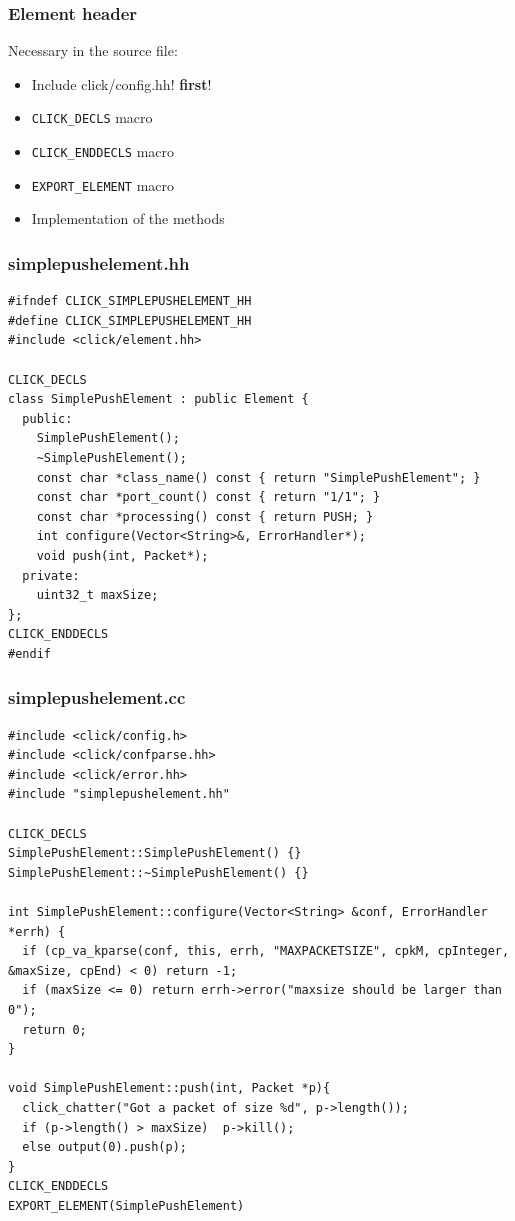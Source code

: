 \documentclass{beamer}
\begin{document}
\begin{frame}[fragile]
\frametitle{Element header}
Necessary in the source file:
\begin{itemize}
	\item Include \!click/config.hh! \textbf{first}!
	\item \lstinline!CLICK_DECLS! macro
	\item \lstinline!CLICK_ENDDECLS! macro
	\item \lstinline!EXPORT_ELEMENT! macro
	\item Implementation of the methods
\end{itemize}
\end{frame}

\begin{frame}[fragile]
\frametitle{simplepushelement.hh}
\begin{lstlisting}[basicstyle=\scriptsize]
#ifndef CLICK_SIMPLEPUSHELEMENT_HH
#define CLICK_SIMPLEPUSHELEMENT_HH
#include <click/element.hh>

CLICK_DECLS
class SimplePushElement : public Element { 
  public:
    SimplePushElement();
    ~SimplePushElement();
    const char *class_name() const { return "SimplePushElement"; }
    const char *port_count() const { return "1/1"; }
    const char *processing() const { return PUSH; }
    int configure(Vector<String>&, ErrorHandler*);
    void push(int, Packet*);
  private:
    uint32_t maxSize;
};
CLICK_ENDDECLS
#endif
\end{lstlisting}
\end{frame}

\begin{frame}
\frametitle{simplepushelement.cc}
\begin{lstlisting}[basicstyle=\scriptsize]
#include <click/config.h>
#include <click/confparse.hh>
#include <click/error.hh>
#include "simplepushelement.hh"

CLICK_DECLS
SimplePushElement::SimplePushElement() {}
SimplePushElement::~SimplePushElement() {}

int SimplePushElement::configure(Vector<String> &conf, ErrorHandler *errh) {
  if (cp_va_kparse(conf, this, errh, "MAXPACKETSIZE", cpkM, cpInteger, &maxSize, cpEnd) < 0) return -1;
  if (maxSize <= 0) return errh->error("maxsize should be larger than 0");
  return 0;
}

void SimplePushElement::push(int, Packet *p){
  click_chatter("Got a packet of size %d", p->length());
  if (p->length() > maxSize)  p->kill();
  else output(0).push(p);
}
CLICK_ENDDECLS
EXPORT_ELEMENT(SimplePushElement)
\end{lstlisting}
\end{frame}
\end{document}
